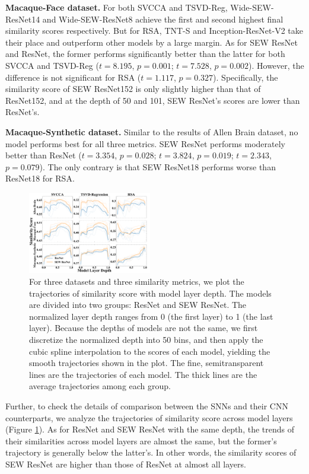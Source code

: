 \documentclass[letterpaper]{article} %
\begin{document}
\textbf{Macaque-Face dataset.} For both SVCCA and TSVD-Reg, Wide-SEW-ResNet14 and Wide-SEW-ResNet8 achieve the first and second highest final similarity scores respectively. But for RSA, TNT-S and Inception-ResNet-V2 take their place and outperform other models by a large margin. As for SEW ResNet and ResNet, the former performs significantly better than the latter for both SVCCA and TSVD-Reg ($t=8.195$, $p=0.001$; $t=7.528$, $p=0.002$). However, the difference is not significant for RSA ($t=1.117$, $p=0.327$). Specifically, the similarity score of SEW ResNet152 is only slightly higher than that of ResNet152, and at the depth of 50 and 101, SEW ResNet's scores are lower than ResNet's.

\textbf{Macaque-Synthetic dataset.} Similar to the results of Allen Brain dataset, no model performs best for all three metrics. SEW ResNet performs moderately better than ResNet ($t=3.354$, $p=0.028$; $t=3.824$, $p=0.019$; $t=2.343$, $p=0.079$). The only contrary is that SEW ResNet18 performs worse than ResNet18 for RSA.

\begin{figure}[t]
	\centering
	\includegraphics[width=0.48\textwidth]{figs/resnet_trajectory_compare.pdf}
	\caption{For three datasets and three similarity metrics, we plot the trajectories of similarity score with model layer depth. The models are divided into two groups: ResNet and SEW ResNet. The normalized layer depth ranges from 0 (the first layer) to 1 (the last layer). Because the depths of models are not the same, we first discretize the normalized depth into 50 bins, and then apply the cubic spline interpolation to the scores of each model, yielding the smooth trajectories shown in the plot. The fine, semitransparent lines are the trajectories of each model. The thick lines are the average trajectories among each group.}
	\label{Fig.resnet_trajectory_compare}
\end{figure}

Further, to check the details of comparison between the SNNs and their CNN counterparts, we analyze the trajectories of similarity score across model layers (Figure \ref{Fig.resnet_trajectory_compare}). As for ResNet and SEW ResNet with the same depth, the trends of their similarities across model layers are almost the same, but the former's trajectory is generally below the latter's. In other words, the similarity scores of SEW ResNet are higher than those of ResNet at almost all layers.
\end{document}

